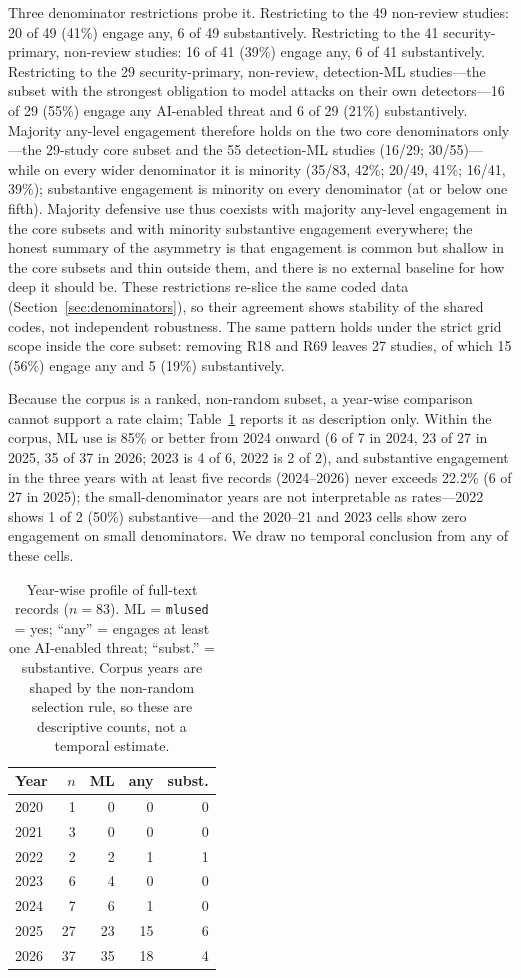 \documentclass[preprint,12pt]{elsarticle}
\renewcommand{\_}{\plainunderscore\allowbreak}
\begin{document}
Three denominator restrictions probe it. Restricting to the 49 non-review studies: 20 of
49 (41\%) engage any, 6 of 49 substantively. Restricting to the 41 security-primary,
non-review studies: 16 of 41 (39\%) engage any, 6 of 41 substantively. Restricting to the
29 security-primary, non-review, detection-ML studies---the subset with the strongest
obligation to model attacks on their own detectors---16 of 29 (55\%) engage any AI-enabled
threat and 6 of 29 (21\%) substantively. Majority any-level engagement therefore holds on
the two core denominators only---the 29-study core subset and the 55 detection-ML studies
(16/29; 30/55)---while on every wider denominator it is minority (35/83, 42\%; 20/49,
41\%; 16/41, 39\%); substantive engagement is minority on every denominator (at or below
one fifth). Majority defensive use thus coexists with majority any-level engagement in
the core subsets and with minority substantive engagement everywhere; the honest summary
of the asymmetry is that engagement is common but shallow in the core subsets and thin
outside them, and there is no external baseline for how deep it should be. These
restrictions re-slice the same coded data (Section~\ref{sec:denominators}), so their
agreement shows stability of the shared codes, not independent robustness. The same
pattern holds under the strict grid scope inside the core subset: removing R18 and R69
leaves 27 studies, of which 15 (56\%) engage any and 5 (19\%) substantively.

Because the corpus is a ranked, non-random subset, a year-wise comparison cannot
support a rate claim; Table~\ref{tab:yearwise} reports it as description only. Within the
corpus, ML use is 85\% or better from 2024 onward (6 of 7 in 2024, 23 of 27 in 2025, 35
of 37 in 2026; 2023 is 4 of 6, 2022 is 2 of 2), and
substantive engagement in the three years with at least five records (2024--2026) never
exceeds 22.2\% (6 of 27 in 2025); the small-denominator years are not interpretable as
rates---2022 shows 1 of
2 (50\%) substantive---and the 2020--21 and 2023 cells show zero engagement on small
denominators. We draw no temporal conclusion from any of these cells.

\begin{table}[t]
\centering
\caption{Year-wise profile of full-text records ($n=83$). ML = \texttt{ml\_used} = yes;
``any'' = engages at least one AI-enabled threat; ``subst.'' = substantive. Corpus years
are shaped by the non-random selection rule, so these are descriptive counts, not a
temporal estimate.}
\label{tab:yearwise}
\small
\begin{tabular}{@{}lrrrr@{}}
\toprule
Year & $n$ & ML & any & subst. \\
\midrule
2020 & 1 & 0 & 0 & 0 \\
2021 & 3 & 0 & 0 & 0 \\
2022 & 2 & 2 & 1 & 1 \\
2023 & 6 & 4 & 0 & 0 \\
2024 & 7 & 6 & 1 & 0 \\
2025 & 27 & 23 & 15 & 6 \\
2026 & 37 & 35 & 18 & 4 \\
\bottomrule
\end{tabular}
\end{table}
\end{document}
